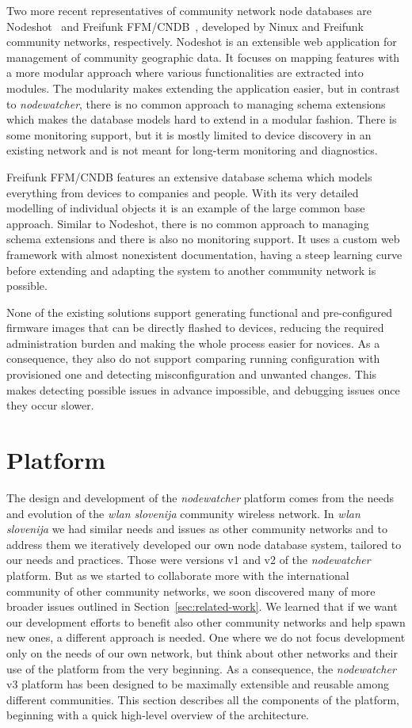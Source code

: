 \documentclass[5p,sort&compress]{elsarticle}
\newcommand{\nodewatcher}{\textit{nodewatcher}}
\newcommand{\wlanslovenija}{\textit{wlan slovenija}}
\begin{document}
Two more recent representatives of community network node databases are Nodeshot~\cite{Nodeshot_2012} and Freifunk FFM/CNDB~\cite{Funkfeuer_2012}, developed by Ninux and Freifunk community networks, respectively.
Nodeshot is an extensible web application for management of community geographic data.
It focuses on mapping features with a more modular approach where various functionalities are extracted into modules.
The modularity makes extending the application easier, but in contrast to \nodewatcher{}, there is no common approach to managing schema extensions which makes the database models hard to extend in a modular fashion.
There is some monitoring support, but it is mostly limited to device discovery in an existing network and is not meant for long-term monitoring and diagnostics.

Freifunk FFM/CNDB features an extensive database schema which models everything from devices to companies and people.
With its very detailed modelling of individual objects it is an example of the large common base approach.
Similar to Nodeshot, there is no common approach to managing schema extensions and there is also no monitoring support.
It uses a custom web framework with almost nonexistent documentation, having a steep learning curve before extending and adapting the system to another community network is possible.

None of the existing solutions support generating functional and pre-configured firmware images that can be directly flashed to devices, reducing the required administration burden and making the whole process easier for novices.
As a consequence, they also do not support comparing running configuration with provisioned one and detecting misconfiguration and unwanted changes.
This makes detecting possible issues in advance impossible, and debugging issues once they occur slower.

\section{Platform}
\label{sec:platform}

The design and development of the \nodewatcher{} platform comes from the needs and evolution of the \wlanslovenija{} community wireless network.
In \wlanslovenija{} we had similar needs and issues as other community networks and to address them we iteratively developed our own node database system, tailored to our needs and practices.
Those were versions v1 and v2 of the \nodewatcher{} platform.
But as we started to collaborate more with the international community of other community networks, we soon discovered many of more broader issues outlined in Section~\ref{sec:related-work}.
We learned that if we want our development efforts to benefit also other community networks and help spawn new ones, a different approach is needed.
One where we do not focus development only on the needs of our own network, but think about other networks and their use of the platform from the very beginning.
As a consequence, the \nodewatcher{} v3 platform has been designed to be maximally extensible and reusable among different communities.
This section describes all the components of the platform, beginning with a quick high-level overview of the architecture.
\end{document}
